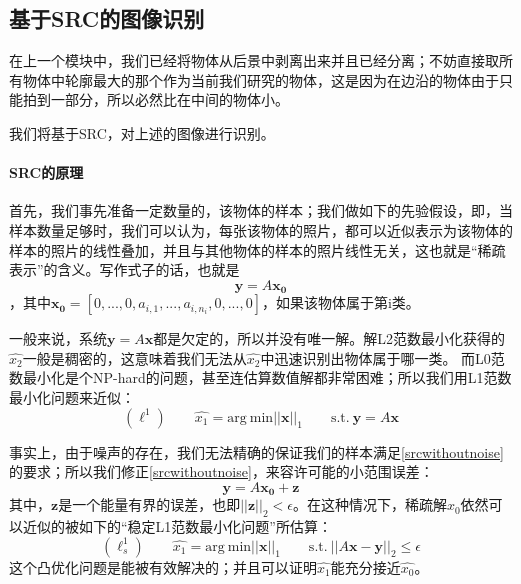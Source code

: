 \documentclass[a4paper,12pt]{article}
\begin{document}
\subsection{基于SRC的图像识别}
在上一个模块中，我们已经将物体从后景中剥离出来并且已经分离；不妨直接取所有物体中轮廓最大的那个作为当前我们研究的物体，这是因为在边沿的物体由于只能拍到一部分，所以必然比在中间的物体小。

我们将基于SRC，对上述的图像进行识别。

\paragraph{SRC的原理}
首先，我们事先准备一定数量的，该物体的样本；我们做如下的先验假设，即，当样本数量足够时，我们可以认为，每张该物体的照片，都可以近似表示为该物体的样本的照片的线性叠加，并且与其他物体的样本的照片线性无关，这也就是“稀疏表示”的含义。写作式子的话，也就是
\begin{equation}\label{srcwithoutnoise}
\boldsymbol{y} = A\boldsymbol{x_{0}} 
\end{equation}
，其中$\boldsymbol{x_{0}} = [0, ..., 0, a_{i, 1}, ..., a_{i, n_{i}}, 0, ..., 0]$，如果该物体属于第i类。

一般来说，系统$\boldsymbol{y} = A\boldsymbol{x}$都是欠定的，所以并没有唯一解。解L2范数最小化获得的$\hat{x_{2}}$一般是稠密的，这意味着我们无法从$\hat{x_{2}}$中迅速识别出物体属于哪一类。 而L0范数最小化是个NP-hard的问题，甚至连估算数值解都非常困难；所以我们用L1范数最小化问题来近似：
\begin{equation}\label{l1}
(\ell^{1})\qquad\hat{x_{1}} = \text{arg}\ \text{min} ||\boldsymbol{x} ||_{1} \qquad\text{s.t.}\: \boldsymbol{y} = A \boldsymbol{x} 
\end{equation}

事实上，由于噪声的存在，我们无法精确的保证我们的样本满足\eqref{srcwithoutnoise}的要求；所以我们修正\eqref{srcwithoutnoise}，来容许可能的小范围误差：
\begin{equation}\label{srcwithnoise}
\boldsymbol{y} = A\boldsymbol{x_{0}} + \boldsymbol{z}
\end{equation}
其中，$\boldsymbol{z}$是一个能量有界的误差，也即$||\boldsymbol{z}||_{2} < \epsilon$。在这种情况下，稀疏解$x_{0}$依然可以近似的被如下的“稳定L1范数最小化问题”所估算：
\begin{equation}\label{stable_l1}
(\ell^{1}_{s})\qquad\hat{x_{1}} = \text{arg}\ \text{min} ||\boldsymbol{x} ||_{1} \qquad\text{s.t.}\: ||A\boldsymbol{x}-\boldsymbol{y}||_{2} \leq \epsilon 
\end{equation}
这个凸优化问题是能被有效解决的；并且可以证明$\hat{x_{1}}$能充分接近$\hat{x_{0}}$。
\end{document}
